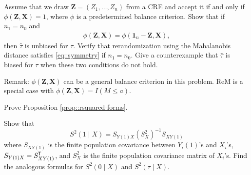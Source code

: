 \begin{HomeworkProblem}\label{exr:6-3}

Assume that we draw $\mathbf{Z} = (Z_1, \ldots, Z_n)$ from a CRE and accept it if and only if $\phi(\mathbf{Z}, \mathbf{X}) = 1$, where $\phi$ is a predetermined balance criterion. Show that if $n_1 = n_0$ and
\begin{eqnarray}
\phi(\mathbf{Z}, \mathbf{X}) = \phi(\mathbf{1}_n-\mathbf{Z}, \mathbf{X}), \label{eq::symmetry}
\end{eqnarray}
then $\hat{\tau}$ is unbiased for $\tau$.
Verify that rerandomization using the Mahalanobis distance satisfies \eqref{eq::symmetry} if $n_1 = n_0$.
Give a counterexample that $\hat{\tau}$ is biased for $\tau$ when these two conditions do not hold.


Remark: $\phi(\mathbf{Z}, \mathbf{X}) $ can be a general balance criterion in this problem. ReM is a special case with $\phi(\mathbf{Z}, \mathbf{X})  =  I(M\leq a) $.


\end{HomeworkProblem}

\begin{HomeworkProblem}\label{exr:6-4}

Prove Proposition \ref{prop::rsquared-forms}.



\end{HomeworkProblem}

\begin{HomeworkProblem}\label{exr:6-5}



Show that
\[
S^2(1\mid X) = S_{Y(1)X} (S_X^2)^{-1} S_{XY(1)}
\]
where $S_{XY(1)}$ is the finite population covariance between $Y_i(1)$'s and $X_i$'s, $S_{Y(1)X} = S_{XY(1)}^{\mkern-1.5mu\mathsf{T}}$, and $S_X^2$ is the finite population covariance matrix of $X_i$'s.
Find the analogous formulas for $S^2(0\mid X) $ and $S^2(\tau\mid X) .$



\end{HomeworkProblem}

